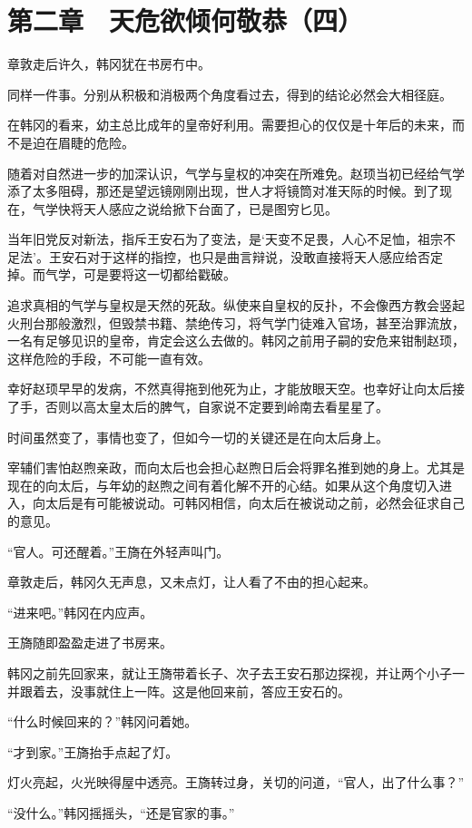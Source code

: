 \section{第二章　天危欲倾何敬恭（四）}

章敦走后许久，韩冈犹在书房冇中。

同样一件事。分别从积极和消极两个角度看过去，得到的结论必然会大相径庭。

在韩冈的看来，幼主总比成年的皇帝好利用。需要担心的仅仅是十年后的未来，而不是迫在眉睫的危险。

随着对自然进一步的加深认识，气学与皇权的冲突在所难免。赵顼当初已经给气学添了太多阻碍，那还是望远镜刚刚出现，世人才将镜筒对准天际的时候。到了现在，气学快将天人感应之说给掀下台面了，已是图穷匕见。

当年旧党反对新法，指斥王安石为了变法，是‘天变不足畏，人心不足恤，祖宗不足法’。王安石对于这样的指控，也只是曲言辩说，没敢直接将天人感应给否定掉。而气学，可是要将这一切都给戳破。

追求真相的气学与皇权是天然的死敌。纵使来自皇权的反扑，不会像西方教会竖起火刑台那般激烈，但毁禁书籍、禁绝传习，将气学门徒难入官场，甚至治罪流放，一名有足够见识的皇帝，肯定会这么去做的。韩冈之前用子嗣的安危来钳制赵顼，这样危险的手段，不可能一直有效。

幸好赵顼早早的发病，不然真得拖到他死为止，才能放眼天空。也幸好让向太后接了手，否则以高太皇太后的脾气，自家说不定要到岭南去看星星了。

时间虽然变了，事情也变了，但如今一切的关键还是在向太后身上。

宰辅们害怕赵煦亲政，而向太后也会担心赵煦日后会将罪名推到她的身上。尤其是现在的向太后，与年幼的赵煦之间有着化解不开的心结。如果从这个角度切入进入，向太后是有可能被说动。可韩冈相信，向太后在被说动之前，必然会征求自己的意见。

“官人。可还醒着。”王旖在外轻声叫门。

章敦走后，韩冈久无声息，又未点灯，让人看了不由的担心起来。

“进来吧。”韩冈在内应声。

王旖随即盈盈走进了书房来。

韩冈之前先回家来，就让王旖带着长子、次子去王安石那边探视，并让两个小子一并跟着去，没事就住上一阵。这是他回来前，答应王安石的。

“什么时候回来的？”韩冈问着她。

“才到家。”王旖抬手点起了灯。

灯火亮起，火光映得屋中透亮。王旖转过身，关切的问道，“官人，出了什么事？”

“没什么。”韩冈摇摇头，“还是官家的事。”

